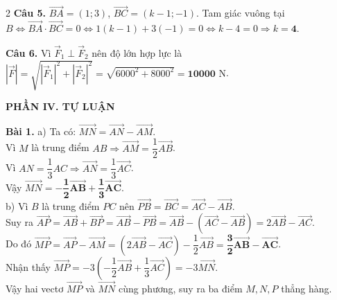 \documentclass[10pt,a4paper]{article}
\begin{document}
\begin{multicols}{2}
\textbf{Câu 5.} $\vec{BA} = (1; 3)$, $\vec{BC} = (k - 1; -1)$. Tam giác vuông tại $B \Leftrightarrow \vec{BA} \cdot \vec{BC} = 0 \Leftrightarrow 1(k - 1) + 3(-1) = 0 \Leftrightarrow k - 4 = 0 \Rightarrow k = \mathbf{4}$.

\textbf{Câu 6.} Vì $\vec{F}_1 \perp \vec{F}_2$ nên độ lớn hợp lực là $|\vec{F}| = \sqrt{|\vec{F}_1|^2 + |\vec{F}_2|^2} = \sqrt{6000^2 + 8000^2} = \mathbf{10000}\text{ N}$.

\textbf{\color{accent}PHẦN IV. TỰ LUẬN}

\textbf{Bài 1.}
a) Ta có: $\vec{MN} = \vec{AN} - \vec{AM}$.\\
Vì $M$ là trung điểm $AB \Rightarrow \vec{AM} = \dfrac{1}{2}\vec{AB}$.\\
Vì $AN = \dfrac{1}{3}AC \Rightarrow \vec{AN} = \dfrac{1}{3}\vec{AC}$.\\
Vậy $\vec{MN} = \mathbf{-\dfrac{1}{2}\vec{AB} + \dfrac{1}{3}\vec{AC}}$.\\
b) Vì $B$ là trung điểm $PC$ nên $\vec{PB} = \vec{BC} = \vec{AC} - \vec{AB}$.\\
Suy ra $\vec{AP} = \vec{AB} + \vec{BP} = \vec{AB} - \vec{PB} = \vec{AB} - (\vec{AC} - \vec{AB}) = 2\vec{AB} - \vec{AC}$.\\
Do đó $\vec{MP} = \vec{AP} - \vec{AM} = (2\vec{AB} - \vec{AC}) - \dfrac{1}{2}\vec{AB} = \mathbf{\dfrac{3}{2}\vec{AB} - \vec{AC}}$.\\
Nhận thấy $\vec{MP} = -3\left(-\dfrac{1}{2}\vec{AB} + \dfrac{1}{3}\vec{AC}\right) = -3\vec{MN}$.\\
Vậy hai vectơ $\vec{MP}$ và $\vec{MN}$ cùng phương, suy ra ba điểm $M, N, P$ thẳng hàng.


\end{multicols}
\end{document}
